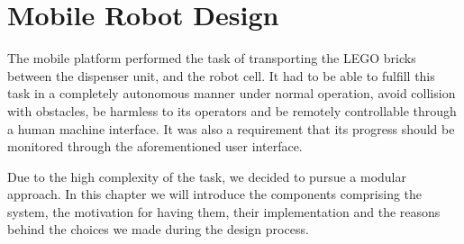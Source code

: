 \chapter{Mobile Robot Design}\label{chap:mobile_robot_chapter}

The mobile platform performed the task of transporting the LEGO bricks between the dispenser unit, and the robot cell. It had to be able to fulfill this task in a completely autonomous manner under normal operation, avoid collision with obstacles, be harmless to its operators and be remotely controllable through a human machine interface. It was also a requirement that its progress should be monitored through the aforementioned user interface. 

Due to the high complexity of the task, we decided to pursue a modular approach. In this chapter we will introduce the components comprising the system, the motivation for having them, their implementation and the reasons behind the choices we made during the design process.













